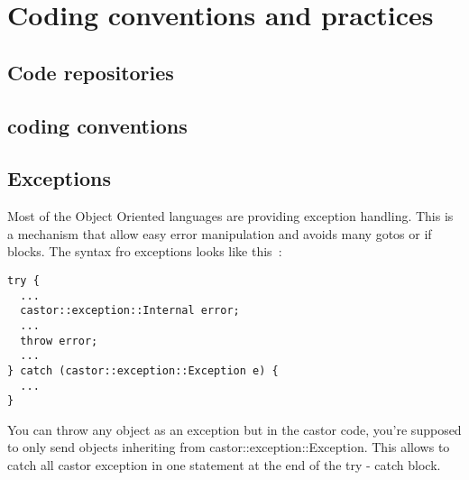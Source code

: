 %
%
%
%
%

\chapter{Coding conventions and practices}

\section{Code repositories}

\section{\cpp coding conventions}

\section{Exceptions}

Most of the Object Oriented languages are providing exception handling. This
is a mechanism that allow easy error manipulation and avoids many gotos or
if blocks. The \cpp syntax fro exceptions looks like this~:
\begin{verbatim}
try {
  ...
  castor::exception::Internal error;
  ...
  throw error;
  ...
} catch (castor::exception::Exception e) {
  ...
}
\end{verbatim}
You can throw any object as an exception but in the castor code,
you're supposed to only send objects inheriting from
castor::exception::Exception.
This allows to catch all castor exception in one statement at the
end of the try - catch block.

